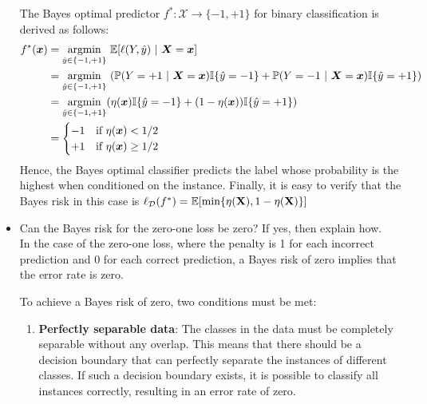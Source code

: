 \begin{itemize}
        The Bayes optimal predictor $f^{*} : \mathcal{X} \rightarrow \{-1, +1\}$ for binary classification is derived as follows:
        \begin{equation}
            \begin{split}
                f^{*}(\boldsymbol{x}) & = \underset{\hat{y} \in \{-1,+1\}}{\textmd{argmin}}\ \mathbb{E}[\ell(Y, \hat{y})\ |\ \boldsymbol{X} = \boldsymbol{x}]\\
                                      & = \underset{\hat{y} \in \{-1,+1\}}{\textmd{argmin}}\ (\mathbb{P}(Y = +1\ |\ \boldsymbol{X} = \boldsymbol{x})\mathbb{I}\{\hat{y} = -1\} + \mathbb{P}(Y = -1\ |\ \boldsymbol{X} = \boldsymbol{x})\mathbb{I}\{\hat{y} = +1\})\\                                   
                                      & = \underset{\hat{y} \in \{-1,+1\}}{\textmd{argmin}} (\eta(\boldsymbol{x})\mathbb{I}\{\hat{y} = -1\} + (1-\eta(\boldsymbol{x}))\mathbb{I}\{\hat{y} = +1\})\\
                                      & = \begin{cases}
                                          -1 & \textmd{if}\ \eta(\boldsymbol{x}) < 1/2\\
                                            +1 & \textmd{if}\ \eta(\boldsymbol{x}) \geq 1/2                                           \end{cases}
            \end{split}
        \end{equation}
        Hence, the Bayes optimal classifier predicts the label whose probability is the highest when conditioned on the instance. Finally, it is easy to verify that the Bayes risk in this case is $\ell_{\mathcal{D}}(f^{*}) = \mathbb{E}[\textmd{min}\{\eta(\textbf{X}), 1-\eta(\textbf{X})\}]$\\

    \item Can the Bayes risk for the zero-one loss be zero? If yes, then explain how.\\

        In the case of the zero-one loss, where the penalty is 1 for each incorrect prediction and 0 for each correct prediction, a Bayes risk of zero implies that the error rate is zero.

        To achieve a Bayes risk of zero, two conditions must be met:

        \begin{enumerate}
            \item \textbf{Perfectly separable data}: The classes in the data must be completely separable without any overlap. This means that there should be a decision boundary that can perfectly separate the instances of different classes. If such a decision boundary exists, it is possible to classify all instances correctly, resulting in an error rate of zero.


\end{enumerate}
\end{itemize}
